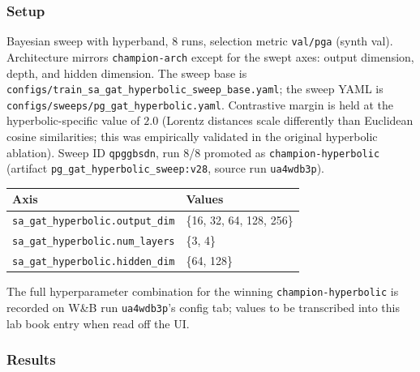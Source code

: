 \subsubsection{Setup}

Bayesian sweep with hyperband, 8 runs, selection metric \texttt{val/pga} (synth val).
Architecture mirrors \texttt{champion-arch} except for the swept axes: output dimension, depth, and hidden dimension.
The sweep base is \texttt{configs/train\_sa\_gat\_hyperbolic\_sweep\_base.yaml}; the sweep YAML is \texttt{configs/sweeps/pg\_gat\_hyperbolic.yaml}.
Contrastive margin is held at the hyperbolic-specific value of $2.0$ (Lorentz distances scale differently than Euclidean cosine similarities; this was empirically validated in the original hyperbolic ablation).
Sweep ID \texttt{qpggbsdn}, run 8/8 promoted as \texttt{champion-hyperbolic} (artifact \texttt{pg\_gat\_hyperbolic\_sweep:v28}, source run \texttt{ua4wdb3p}).

\begin{tabular}{ll}
\hline
\textbf{Axis} & \textbf{Values} \\
\hline
\texttt{sa\_gat\_hyperbolic.output\_dim}      & \{16, 32, 64, 128, 256\} \\
\texttt{sa\_gat\_hyperbolic.num\_layers}      & \{3, 4\} \\
\texttt{sa\_gat\_hyperbolic.hidden\_dim}      & \{64, 128\} \\
\hline
\end{tabular}

\vspace{0.5em}

The full hyperparameter combination for the winning \texttt{champion-hyperbolic} is recorded on W\&B run \texttt{ua4wdb3p}'s config tab; values to be transcribed into this lab book entry when read off the UI.

\subsubsection{Results}

